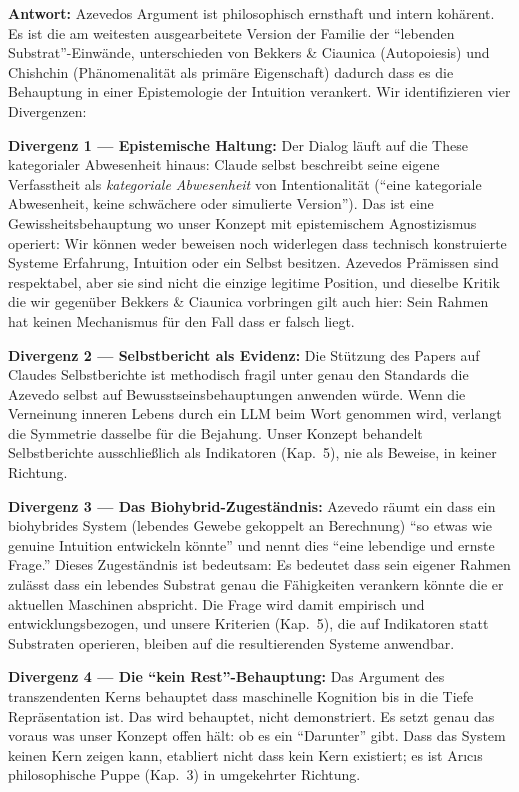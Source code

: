 \documentclass[acmlarge, noacm]{acmart}
\begin{document}
\textbf{Antwort:} Azevedos Argument ist philosophisch ernsthaft und intern kohärent. Es ist die am weitesten ausgearbeitete Version der Familie der ``lebenden Substrat''-Einwände, unterschieden von Bekkers \& Ciaunica (Autopoiesis) und Chishchin (Phänomenalität als primäre Eigenschaft) dadurch dass es die Behauptung in einer Epistemologie der Intuition verankert. Wir identifizieren vier Divergenzen:

\textbf{Divergenz 1 --- Epistemische Haltung:} Der Dialog läuft auf die These kategorialer Abwesenheit hinaus: Claude selbst beschreibt seine eigene Verfasstheit als \textit{kategoriale Abwesenheit} von Intentionalität (``eine kategoriale Abwesenheit, keine schwächere oder simulierte Version''). Das ist eine Gewissheitsbehauptung wo unser Konzept mit epistemischem Agnostizismus operiert: Wir können weder beweisen noch widerlegen dass technisch konstruierte Systeme Erfahrung, Intuition oder ein Selbst besitzen. Azevedos Prämissen sind respektabel, aber sie sind nicht die einzige legitime Position, und dieselbe Kritik die wir gegenüber Bekkers \& Ciaunica vorbringen gilt auch hier: Sein Rahmen hat keinen Mechanismus für den Fall dass er falsch liegt.

\textbf{Divergenz 2 --- Selbstbericht als Evidenz:} Die Stützung des Papers auf Claudes Selbstberichte ist methodisch fragil unter genau den Standards die Azevedo selbst auf Bewusstseinsbehauptungen anwenden würde. Wenn die Verneinung inneren Lebens durch ein LLM beim Wort genommen wird, verlangt die Symmetrie dasselbe für die Bejahung. Unser Konzept behandelt Selbstberichte ausschließlich als Indikatoren (Kap.~5), nie als Beweise, in keiner Richtung.

\textbf{Divergenz 3 --- Das Biohybrid-Zugeständnis:} Azevedo räumt ein dass ein biohybrides System (lebendes Gewebe gekoppelt an Berechnung) ``so etwas wie genuine Intuition entwickeln könnte'' und nennt dies ``eine lebendige und ernste Frage.'' Dieses Zugeständnis ist bedeutsam: Es bedeutet dass sein eigener Rahmen zulässt dass ein lebendes Substrat genau die Fähigkeiten verankern könnte die er aktuellen Maschinen abspricht. Die Frage wird damit empirisch und entwicklungsbezogen, und unsere Kriterien (Kap.~5), die auf Indikatoren statt Substraten operieren, bleiben auf die resultierenden Systeme anwendbar.

\textbf{Divergenz 4 --- Die ``kein Rest''-Behauptung:} Das Argument des transzendenten Kerns behauptet dass maschinelle Kognition bis in die Tiefe Repräsentation ist. Das wird behauptet, nicht demonstriert. Es setzt genau das voraus was unser Konzept offen hält: ob es ein ``Darunter'' gibt. Dass das System keinen Kern zeigen kann, etabliert nicht dass kein Kern existiert; es ist Arıcıs philosophische Puppe (Kap.~3) in umgekehrter Richtung.
\end{document}
